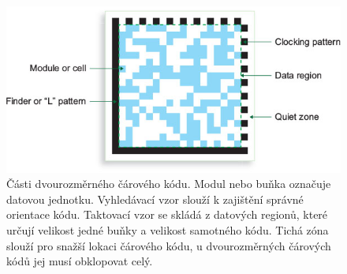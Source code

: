 \begin{figure}[h]\centering
    \centering
    \includegraphics[width=0.8\linewidth]{obrazky-figures/barcode2D.png}
    \caption{Části dvourozměrného čárového kódu. Modul nebo buňka označuje datovou jednotku. Vyhledávací vzor slouží k zajištění správné orientace kódu. Taktovací vzor se skládá z datových regionů, které určují velikost jedné buňky a velikost samotného kódu. Tichá zóna slouží pro snažší lokaci čárového kódu, u dvourozměrných čárových kódů jej musí obklopovat celý\protect\footnotemark{}.}
    \label{barcode2d}
\end{figure}

